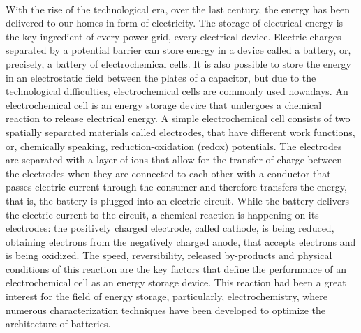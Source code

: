 \paragraph*{}
With the rise of the technological era, over the last century, the energy has been delivered to our homes in form of electricity. The storage of electrical energy is the key ingredient of every power grid, every electrical device. Electric charges separated by a potential barrier can store energy in a device called a battery, or, precisely, a battery of electrochemical cells. It is also possible to store the energy in an electrostatic field between the plates of a capacitor, but due to the technological difficulties, electrochemical cells are commonly used nowadays. An electrochemical cell is an energy storage device that undergoes a chemical reaction to release electrical energy. A simple electrochemical cell consists of two spatially separated materials called electrodes, that have different work functions, or, chemically speaking, reduction-oxidation (redox) potentials. The electrodes are separated with a layer of ions that allow for the transfer of charge between the electrodes when they are connected to each other with a conductor that passes electric current through the consumer and therefore transfers the energy, that is, the battery is plugged into an electric circuit. While the battery delivers the electric current to the circuit, a chemical reaction is happening on its electrodes: the positively charged electrode, called cathode, is being reduced, obtaining electrons from the negatively charged anode, that accepts electrons and is being oxidized. The speed, reversibility, released by-products and physical conditions of this reaction are the key factors that define the performance of an electrochemical cell as an energy storage device. This reaction had been a great interest for the field of energy storage, particularly, electrochemistry, where numerous characterization techniques have been developed to optimize the architecture of batteries.\\
